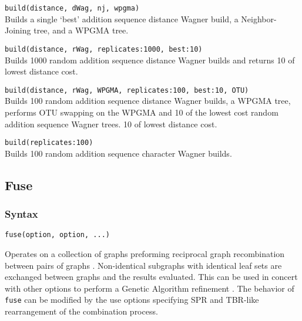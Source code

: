 	\begin{example}
	
		\item{\texttt{build(distance, dWag, nj, wpgma)} \\ 
		Builds a single `best' addition sequence distance Wagner build, 
		a Neighbor-Joining tree, and a WPGMA tree.}
		
		\item{\texttt{build(distance, rWag, replicates:1000, best:10)}\\
		Builds 1000 random addition sequence distance Wagner builds and returns 
		10 of lowest distance cost.}
	
		\item{\texttt{build(distance, rWag, WPGMA, replicates:100, best:10, OTU)}\\
		Builds 100 random addition sequence distance Wagner builds, a WPGMA tree, 
		performs OTU swapping on the WPGMA and 10 of the lowest cost random addition 
		sequence Wagner trees. 
		10 of lowest distance cost.}
	
		\item{\texttt{build(replicates:100)} \\
		Builds 100 random addition sequence character Wagner builds.}

	\end{example}

\subsection{Fuse}
	\subsubsection{Syntax}
		\texttt{fuse(option, option, ...)}
		
	\begin{phygdescription}
		{Operates on a collection of graphs preforming reciprocal graph recombination between pairs of 
		graphs \citep{moilanen1999, moilanen2001, goloboff1999}. Non-identical subgraphs with identical 
		leaf sets are exchanged between graphs and the results evaluated. This can be used in concert 
		with other options to perform a Genetic Algorithm refinement \citep{Holland1975}. The behavior of 
		\texttt{fuse} can be modified by the use options specifying SPR and TBR-like rearrangement of the 
		combination process.}
	\end{phygdescription}
	
